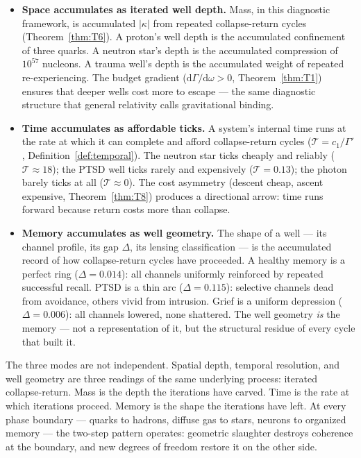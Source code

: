 \documentclass[
  aps,
  prd,
  twocolumn,
  superscriptaddress,
  nofootinbib,
  floatfix
]{revtex4-2}
\newcommand{\Gam}{\Gamma}
\newcommand{\dd}{\mathrm{d}}
\begin{document}
\begin{itemize}
\item \textbf{Space accumulates as iterated well depth.}
  Mass, in this diagnostic framework, is accumulated
  $|\kappa|$ from repeated collapse-return cycles
  (Theorem~\ref{thm:T6}).  A proton's well depth is the
  accumulated confinement of three quarks.  A neutron star's
  depth is the accumulated compression of $10^{57}$
  nucleons.  A trauma well's depth is the accumulated weight
  of repeated re-experiencing.  The budget gradient
  ($\dd\Gam/\dd\omega > 0$, Theorem~\ref{thm:T1}) ensures
  that deeper wells cost more to escape --- the same
  diagnostic structure that general relativity calls
  gravitational binding.

\item \textbf{Time accumulates as affordable ticks.}
  A system's internal time runs at the rate at which it
  can complete and afford collapse-return cycles
  ($\mathcal{T} = c_1/\Gam'$, Definition~\ref{def:temporal}).
  The neutron star ticks cheaply and reliably
  ($\mathcal{T} \approx 18$); the PTSD well ticks rarely
  and expensively ($\mathcal{T} = 0.13$); the photon barely
  ticks at all ($\mathcal{T} \approx 0$).  The cost asymmetry
  (descent cheap, ascent expensive, Theorem~\ref{thm:T8})
  produces a directional arrow: time runs forward because
  return costs more than collapse.

\item \textbf{Memory accumulates as well geometry.}
  The shape of a well --- its channel profile, its gap
  $\Delta$, its lensing classification --- is the accumulated
  record of how collapse-return cycles have proceeded.  A
  healthy memory is a perfect ring ($\Delta = 0.014$): all
  channels uniformly reinforced by repeated successful
  recall.  PTSD is a thin arc ($\Delta = 0.115$): selective
  channels dead from avoidance, others vivid from intrusion.
  Grief is a uniform depression ($\Delta = 0.006$): all
  channels lowered, none shattered.  The well geometry \emph{is}
  the memory --- not a representation of it, but the
  structural residue of every cycle that built it.
\end{itemize}

The three modes are not independent.  Spatial depth,
temporal resolution, and well geometry are three readings of
the same underlying process: iterated collapse-return.  Mass
is the depth the iterations have carved.  Time is the rate at
which iterations proceed.  Memory is the shape the iterations
have left.  At every phase boundary --- quarks to hadrons,
diffuse gas to stars, neurons to organized memory --- the
two-step pattern operates: geometric slaughter destroys
coherence at the boundary, and new degrees of freedom
restore it on the other side.
\end{document}
